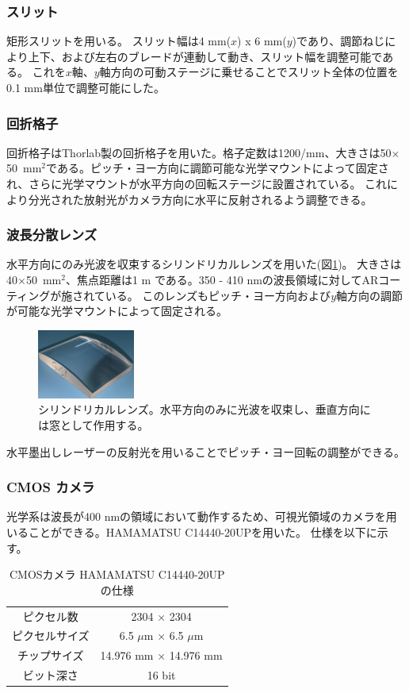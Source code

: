 \documentclass[a4paper,11pt,uplatex]{jsbook}
\begin{document}
\subsubsection{スリット}
矩形スリットを用いる。
スリット幅は4 mm($x$) x 6 mm($y$)であり、調節ねじにより上下、および左右のブレードが連動して動き、スリット幅を調整可能である。
これを$x$軸、$y$軸方向の可動ステージに乗せることでスリット全体の位置を0.1 mm単位で調整可能にした。

\subsubsection{回折格子}
回折格子はThorlab製の回折格子\cite{grating}を用いた。格子定数は1200/mm、大きさは50$\times$50~mm$^2$である。ピッチ・ヨー方向に調節可能な光学マウントによって固定され、さらに光学マウントが水平方向の回転ステージに設置されている。
これにより分光された放射光がカメラ方向に水平に反射されるよう調整できる。

\subsubsection{波長分散レンズ}
水平方向にのみ光波を収束するシリンドリカルレンズを用いた(図\ref{lens})。
大きさは40$\times$50~mm$^2$、焦点距離は1 m である。350 - 410 nmの波長領域に対してARコーティングが施されている。
このレンズもピッチ・ヨー方向および$y$軸方向の調節が可能な光学マウントによって固定される。
\begin{figure}[H]
  \centering
  \includegraphics[width=0.4\linewidth]{image/3-lens.png}
  \caption[シリンドリカルレンズ]{シリンドリカルレンズ。水平方向のみに光波を収束し、垂直方向には窓として作用する。}
  \label{lens}
\end{figure}
水平墨出しレーザーの反射光を用いることでピッチ・ヨー回転の調整ができる。

\subsubsection{CMOS カメラ}
光学系は波長が400 nmの領域において動作するため、可視光領域のカメラを用いることができる。HAMAMATSU C14440-20UPを用いた。
仕様を以下に示す。
\begin{table}[h]
\centering
\begin{tabular}{c|c}
  ピクセル数 & 2304 $\times$ 2304\\
  ピクセルサイズ & 6.5 $\mu$m $\times$ 6.5 $\mu$m\\
  チップサイズ & 14.976 mm $\times$ 14.976 mm\\
  ビット深さ & 16 bit\\ 
\end{tabular}
\caption[CMOSカメラの仕様]{CMOSカメラ HAMAMATSU C14440-20UP の仕様}
\end{table}
\end{document}
